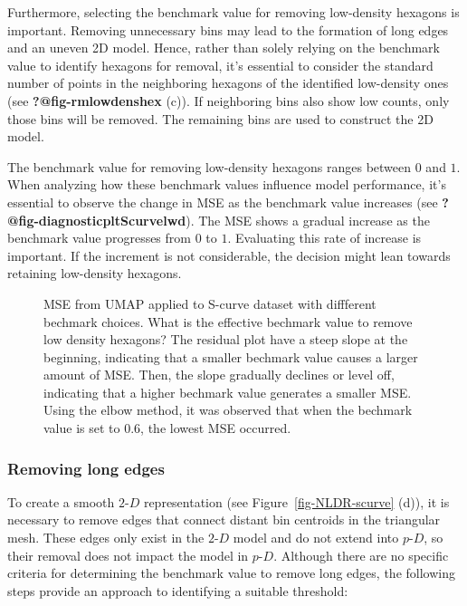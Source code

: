 \documentclass[
  12pt]{article}
\newcommand\pD{$p\text{-}D$}
\newcommand\gD{$2\text{-}D$}
\begin{document}
Furthermore, selecting the benchmark value for removing low-density
hexagons is important. Removing unnecessary bins may lead to the
formation of long edges and an uneven 2D model. Hence, rather than
solely relying on the benchmark value to identify hexagons for removal,
it's essential to consider the standard number of points in the
neighboring hexagons of the identified low-density ones (see
\textbf{?@fig-rmlowdenshex} (c)). If neighboring bins also show low
counts, only those bins will be removed. The remaining bins are used to
construct the 2D model.

The benchmark value for removing low-density hexagons ranges between
\(0\) and \(1\). When analyzing how these benchmark values influence
model performance, it's essential to observe the change in MSE as the
benchmark value increases (see \textbf{?@fig-diagnosticpltScurvelwd}).
The MSE shows a gradual increase as the benchmark value progresses from
\(0\) to \(1\). Evaluating this rate of increase is important. If the
increment is not considerable, the decision might lean towards retaining
low-density hexagons.

\begin{figure}[H]


\caption{\label{fig-mse-scurve-lwd}MSE from UMAP applied to S-curve
dataset with diffferent bechmark choices. What is the effective bechmark
value to remove low density hexagons? The residual plot have a steep
slope at the beginning, indicating that a smaller bechmark value causes
a larger amount of MSE. Then, the slope gradually declines or level off,
indicating that a higher bechmark value generates a smaller MSE. Using
the elbow method, it was observed that when the bechmark value is set to
\(0.6\), the lowest MSE occurred.}

\end{figure}%

\subsubsection{Removing long edges}\label{removing-long-edges}

To create a smooth \gD{} representation (see
Figure~\ref{fig-NLDR-scurve} (d)), it is necessary to remove edges that
connect distant bin centroids in the triangular mesh. These edges only
exist in the \gD{} model and do not extend into \pD{}, so their removal
does not impact the model in \pD{}. Although there are no specific
criteria for determining the benchmark value to remove long edges, the
following steps provide an approach to identifying a suitable threshold:
\end{document}

